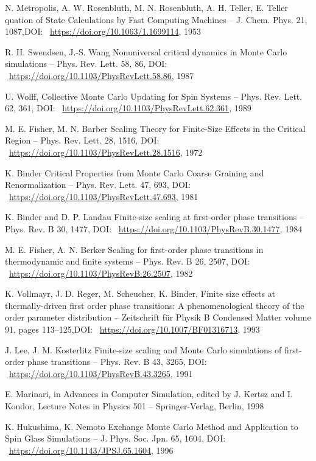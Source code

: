 \documentclass[11pt]{article}
\begin{document}
\begin{thebibliography}{3}
N. Metropolis, A. W. Rosenbluth, M. N. Rosenbluth, A. H. Teller, E. Teller quation of State Calculations by Fast Computing Machines -- J. Chem. Phys. 21, 1087,DOI: ~\url{https://doi.org/10.1063/1.1699114}, 1953

R. H. Swendsen, J.-S. Wang Nonuniversal critical dynamics in Monte Carlo simulations -- Phys. Rev. Lett. 58, 86, DOI: ~\url{https://doi.org/10.1103/PhysRevLett.58.86}, 1987

U. Wolff, Collective Monte Carlo Updating for Spin Systems -- Phys. Rev. Lett. 62, 361, DOI: ~\url{https://doi.org/10.1103/PhysRevLett.62.361}, 1989

 M. E. Fisher, M. N. Barber Scaling Theory for Finite-Size Effects in the Critical Region -- Phys. Rev. Lett. 28, 1516, DOI: ~\url{https://doi.org/10.1103/PhysRevLett.28.1516}, 1972

K. Binder Critical Properties from Monte Carlo Coarse Graining and Renormalization -- Phys. Rev. Lett. 47, 693, DOI: ~\url{https://doi.org/10.1103/PhysRevLett.47.693}, 1981

 K. Binder and D. P. Landau Finite-size scaling at first-order phase transitions -- Phys. Rev. B 30, 1477, DOI: ~\url{https://doi.org/10.1103/PhysRevB.30.1477}, 1984

M. E. Fisher, A. N. Berker Scaling for first-order phase transitions in thermodynamic and finite systems -- Phys. Rev. B 26, 2507, DOI: ~\url{https://doi.org/10.1103/PhysRevB.26.2507}, 1982

K. Vollmayr, J. D. Reger, M. Scheucher, K. Binder, Finite size effects at thermally-driven first order phase transitions: A phenomenological theory of the order parameter distribution -- Zeitschrift für Physik B Condensed Matter volume 91, pages 113–125,DOI: ~\url{https://doi.org/10.1007/BF01316713},  1993

J. Lee, J. M. Kosterlitz Finite-size scaling and Monte Carlo simulations of first-order phase transitions -- Phys. Rev. B 43, 3265, DOI: ~\url{https://doi.org/10.1103/PhysRevB.43.3265}, 1991

E. Marinari, in Advances in Computer Simulation, edited by J. Kertsz and I. Kondor, Lecture Notes in Physics 501 -- Springer-Verlag, Berlin, 1998

K. Hukushima, K. Nemoto Exchange Monte Carlo Method and Application to Spin Glass Simulations -- J. Phys. Soc. Jpn. 65, 1604, DOI: ~\url{https://doi.org/10.1143/JPSJ.65.1604}, 1996


\end{thebibliography}
\end{document}
